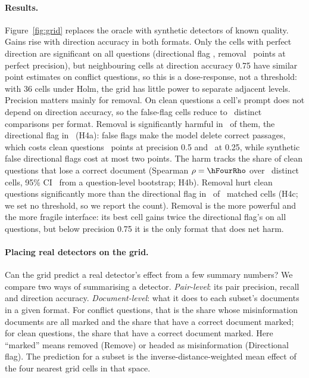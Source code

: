 \paragraph{Results.}
Figure~\ref{fig:grid} replaces the oracle with synthetic detectors of known quality. Gains rise with direction
accuracy in both formats. Only the cells with perfect direction are significant on all questions (directional flag
\gDirOneDOneAll, removal \gRemOneDOneAll\ points at perfect precision), but neighbouring cells at direction accuracy
0.75 have similar point estimates on conflict questions, so this is a dose-response, not a threshold: with 36 cells
under Holm, the grid has little power to separate adjacent levels. Precision matters mainly for removal. On clean questions a cell's prompt does not depend
on direction accuracy, so the false-flag cells reduce to \hFourRemN\ distinct comparisons per format. Removal is
significantly harmful in \hFourRemHarm\ of them, the directional flag in \hFourDirHarm\ (H4a): false flags make the
model delete correct passages, which costs clean questions \agRemHalfDOneClean\ points at precision 0.5 and
\agRemQuDOneClean\ at 0.25, while synthetic false directional flags cost at most two points. The harm tracks the
share of clean questions that lose a correct document (Spearman $\rho=\hFourRho$ over \hFourRhoCells\ distinct
cells, 95\% CI \hFourRhoCI\ from a question-level bootstrap; H4b). Removal hurt clean questions significantly more
than the directional flag in \hFourRemWorse\ of \hFourMatched\ matched cells (H4c; we set no threshold, so we report
the count). Removal is the more powerful and the more fragile interface: its best cell gains twice the directional
flag's on all questions, but below precision 0.75 it is the only format that does net harm.


\paragraph{Placing real detectors on the grid.}
\label{sec:placement}
Can the grid predict a real detector's effect from a few summary numbers? We compare two ways of summarising a
detector. \emph{Pair-level}: its pair precision, recall and direction accuracy. \emph{Document-level}: what it does
to each subset's documents in a given format. For conflict questions, that is the share whose misinformation documents
are all marked and the share that have a correct document marked; for clean questions, the share that have a correct
document marked. Here ``marked'' means removed (Remove) or headed as misinformation (Directional flag). The prediction
for a subset is the inverse-distance-weighted mean effect of the four nearest grid cells in that space.

